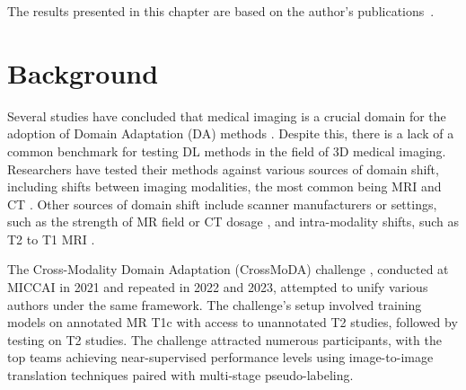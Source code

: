 The results presented in this chapter are based on the author’s publications~\cite{shirokikh2025m3da,Zolotova2023Burdenko}.


\section{Background}

Several studies have concluded that medical imaging is a crucial domain for the adoption of Domain Adaptation (DA) methods \cite{gulrajani2020search,uda_survey_2020,zhuang2020comprehensive,peng2018visda,zhang2021empirical}. Despite this, there is a lack of a common benchmark for testing DL methods in the field of 3D medical imaging.
Researchers have tested their methods against various sources of domain shift, including shifts between imaging modalities, the most common being MRI and CT \cite{jiang2020unified,yu2023source,zheng2021hierarchical}. Other sources of domain shift include scanner manufacturers or settings, such as the strength of MR field or CT dosage \cite{zheng2021hierarchical,liu2020shape,chen2022maxstyle,gu2021domain,lennartz2023segmentation,se_medim}, and intra-modality shifts, such as T2 to T1 MRI \cite{han2021deep,crossmoda,dann_medim}.

The Cross-Modality Domain Adaptation (CrossMoDA) challenge \cite{crossmoda}, conducted at MICCAI in 2021 and repeated in 2022 and 2023, attempted to unify various authors under the same framework. The challenge's setup involved training models on annotated MR T1c with access to unannotated T2 studies, followed by testing on T2 studies. The challenge attracted numerous participants, with the top teams achieving near-supervised performance levels using image-to-image translation techniques paired with multi-stage pseudo-labeling.

